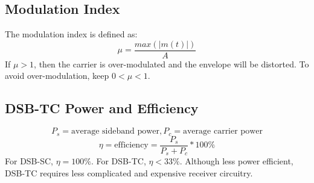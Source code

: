 \documentclass[journal]{IEEEtran}
\begin{document}
\subsection{Modulation Index}
The modulation index is defined as:
\[
	\mu = \frac{max(|m(t)|)}{A}
\]
If $\mu > 1$, then the carrier is over-modulated and the envelope will be distorted. To avoid over-modulation, keep $0 < \mu < 1$.
\subsection{DSB-TC Power and Efficiency}
\[
	P_s = \text{average sideband power}, P_c = \text{average carrier power}
\]
\[
	\eta = \text{efficiency} = \frac{P_s}{P_s + P_c}*100\%
\]
For DSB-SC, $\eta = 100\%$. For DSB-TC, $\eta < 33\%$. Although less power efficient, DSB-TC requires less complicated and expensive receiver circuitry.
\end{document}
